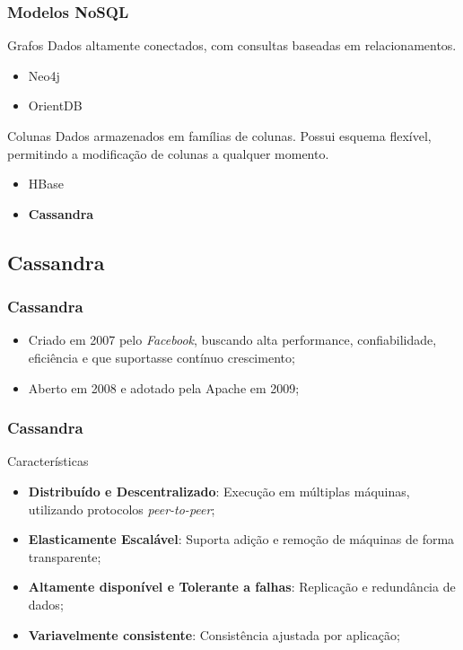 \documentclass[brazil]{beamer}
\begin{document}
\begin{frame}
	\frametitle{Modelos NoSQL}
	
	\begin{block}{Grafos}
		Dados altamente conectados, com consultas baseadas em relacionamentos.
		\begin{itemize}
			\item Neo4j
			\item OrientDB
		\end{itemize}
	\end{block}

	\begin{block}{Colunas}
		Dados armazenados em famílias de colunas. Possui esquema flexível, permitindo a modificação de colunas a qualquer momento.
		\begin{itemize}
			\item HBase
			\item \textbf{Cassandra}
		\end{itemize}
	\end{block}

\end{frame}


\subsection{Cassandra}
\begin{frame}
	\frametitle{Cassandra}
	\begin{itemize}
		\item Criado em 2007 pelo \emph{Facebook}, buscando alta performance, confiabilidade, eficiência e que suportasse  contínuo crescimento;
		\item Aberto em 2008 e adotado pela Apache em 2009;
	\end{itemize}
\end{frame}

\begin{frame}
	\frametitle{Cassandra}
	\begin{block}{Características}
		\begin{itemize}
			\item \textbf{Distribuído e Descentralizado}: Execução em múltiplas máquinas, utilizando protocolos \emph{peer-to-peer};
			
			\item \textbf{Elasticamente Escalável}: Suporta adição e remoção de máquinas de forma transparente;
			
			\item \textbf{Altamente disponível e Tolerante a falhas}: Replicação e redundância de dados;
			
			\item \textbf{Variavelmente consistente}: Consistência ajustada por aplicação;
		\end{itemize} 
	\end{block}
\end{frame}
\end{document}
